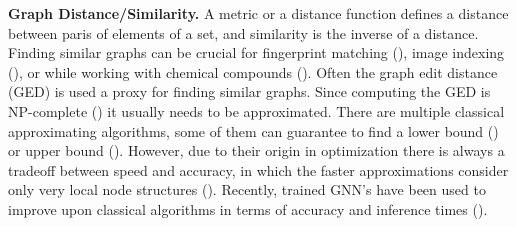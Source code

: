 \textbf{Graph Distance/Similarity.} A metric or a distance function defines a distance between paris of elements of a set, and similarity is the inverse of a distance. Finding similar graphs can be crucial for fingerprint matching (\citealp{fingerprint2005}), image indexing (\citealp{image_index2008}), or while working with chemical compounds (\citealp{chem2006}). Often the graph edit distance (GED) is used a proxy for finding similar graphs. Since computing the GED is NP-complete (\citealp{np_complete1998}) it usually needs to be approximated. There are multiple classical approximating algorithms, some of them can guarantee to find a lower bound (\citealp{hungarian2009}) or upper bound (\citealp{hed2015}). However, due to their origin in optimization there is always a tradeoff between speed and accuracy, in which the faster approximations consider only very local node structures (\citealp{hungarian2009}). Recently, trained GNN's have been used to improve upon classical algorithms in terms of accuracy and inference times (\citealp{bai2019}). %

